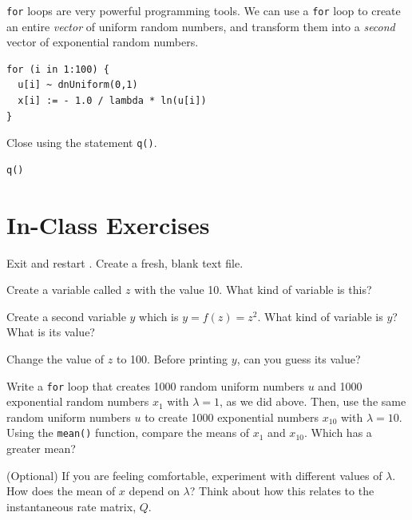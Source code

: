 \noindent \texttt{for} loops are very powerful programming tools.
We can use a \texttt{for} loop to create an entire \emph{vector} of uniform random numbers, and transform them into a \emph{second} vector of exponential random numbers.
{\tt \begin{snugshade*}
\begin{lstlisting}    
for (i in 1:100) {
  u[i] ~ dnUniform(0,1)
  x[i] := - 1.0 / lambda * ln(u[i])
}
\end{lstlisting}
\end{snugshade*}}

\noindent Close \Rev using the statement \texttt{q()}.
{\tt \begin{snugshade*}
\begin{lstlisting}    
q()
\end{lstlisting}
\end{snugshade*}}

\section*{In-Class Exercises}
\noindent Exit and restart \RevBayes.
Create a fresh, blank text file.

\bigskip
\noindent Create a variable called $z$ with the value 10. What kind of variable is this?

\bigskip
\noindent Create a second variable $y$ which is $y = f(z) = z ^ 2$. What kind of variable is $y$? What is its value?

\bigskip
\noindent Change the value of $z$ to 100. Before printing $y$, can you guess its value?

\bigskip
\noindent Write a \texttt{for} loop that creates 1000 random uniform numbers $u$ and 1000 exponential random numbers $x_1$ with $\lambda = 1$, as we did above.
Then, use the same random uniform numbers $u$ to create 1000 exponential numbers $x_{10}$ with $\lambda = 10$.
Using the \texttt{mean()} function, compare the means of $x_1$ and $x_{10}$.
Which has a greater mean?

\bigskip
\noindent (Optional) If you are feeling comfortable, experiment with different values of $\lambda$. 
How does the mean of $x$ depend on $\lambda$?
Think about how this relates to the instantaneous rate matrix, $Q$.




